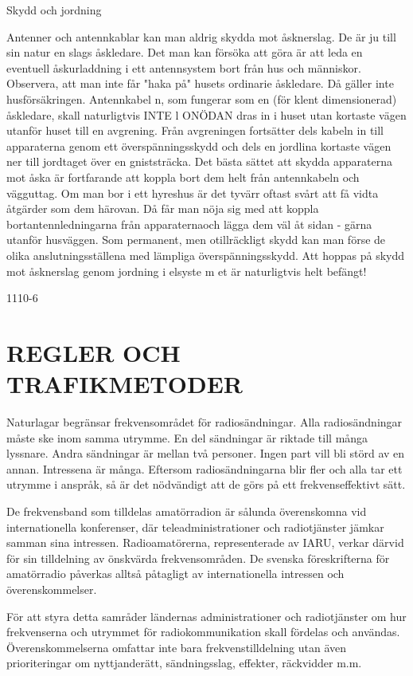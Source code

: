 \documentclass[a4paper,twoside,twocolumn,openright]{book}
\begin{document}
{{{{{Skydd och jordning

Antenner och antennkablar kan man aldrig
skydda mot åsknerslag. De är ju till sin natur
en slags åskledare. Det man kan försöka att
göra är att leda en eventuell åskurladdning i
ett antennsystem bort från hus och människor. Observera, att man inte får "haka på"
husets ordinarie åskledare. Då gäller inte
husförsäkringen.
Antennkabel n, som fungerar som en (för
klent dimensionerad) åskledare, skall naturligtvis INTE l ONÖDAN dras in i huset utan
kortaste vägen utanför huset till en avgrening.
Från avgreningen fortsätter dels kabeln
in till apparaterna genom ett överspänningsskydd och dels en jordlina kortaste vägen
ner till jordtaget över en gniststräcka. Det
bästa sättet att skydda apparaterna mot
åska är fortfarande att koppla bort dem helt
från antennkabeln och vägguttag.
Om man bor i ett hyreshus är det tyvärr
oftast svårt att få vidta åtgärder som dem
härovan. Då får man nöja sig med att koppla
bortantennledningarna från apparaternaoch
lägga dem väl åt sidan - gärna utanför
husväggen.
Som permanent, men otillräckligt skydd
kan man förse de olika anslutningsställena
med lämpliga överspänningsskydd.
Att hoppas på skydd mot åsknerslag genom jordning i elsyste m et är naturligtvis helt
befängt!

1110-6

\part{REGLER OCH TRAFIKMETODER}

Naturlagar begränsar frekvensområdet för
radiosändningar. Alla radiosändningar måste
ske inom samma utrymme. En del sändningar är riktade till många lyssnare. Andra
sändningar är mellan två personer. Ingen
part vill bli störd av en annan. Intressena är
många. Eftersom radiosändningarna blir fler
och alla tar ett utrymme i anspråk, så är det
nödvändigt att de görs på ett frekvenseffektivt
sätt.

De frekvensband som tilldelas amatörradion är sålunda överenskomna vid internationella konferenser, där teleadministrationer och radiotjänster jämkar samman sina
intressen. Radioamatörerna, representerade av IARU, verkar därvid för sin tilldelning
av önskvärda frekvensområden. De svenska föreskrifterna för amatörradio påverkas
alltså påtagligt av internationella intressen
och överenskommelser.

För att styra detta samråder ländernas
administrationer och radiotjänster om hur
frekvenserna och utrymmet för radiokommunikation skall fördelas och användas.
Överenskommelserna omfattar inte bara
frekvenstilldelning utan även prioriteringar
om nyttjanderätt, sändningsslag, effekter,
räckvidder m.m.

}}}}}
\end{document}
